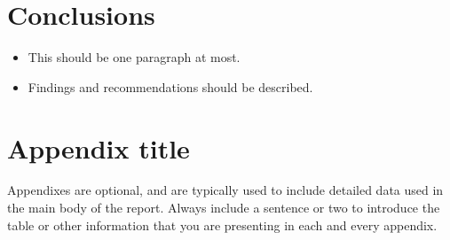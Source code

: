 \documentclass{bcrre_assignment}
\begin{document}
\section{Conclusions}
\begin{itemize}
    \item This should be one paragraph at most. 
    \item Findings and recommendations should be described.
\end{itemize}

\printbibliography

\appendix
\section{Appendix title}
Appendixes are optional, and are typically used to include detailed data used in the main body of the report.  Always include a sentence or two to introduce the table or other information that you are presenting in each and every appendix. 
\end{document}
